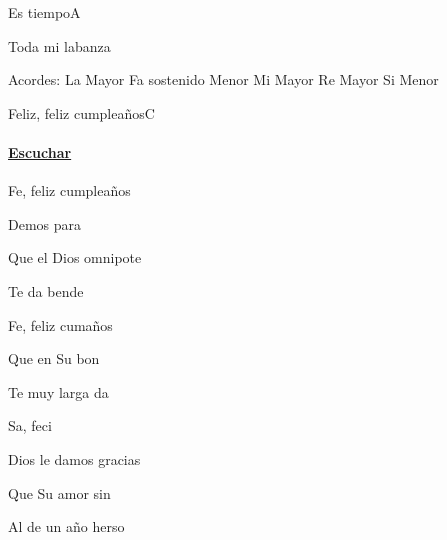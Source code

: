 \documentclass[12pt, spanish]{book}
\newcommand{\NotCCLIed}{\relax}
\begin{document}
\begin{song}{Es tiempo}{A}
\begin{SBOpGroup}
            Toda mi labanza 
        \end{SBOpGroup}

        \ifChordBk
        \begin{SBOpGroup}
            Acordes:
            \upchord{\A}\qquad La Mayor \hfill
            \upchord{\Fsm}\qquad Fa sostenido Menor \hfill\null\break
            \upchord{\E}\qquad Mi Mayor \hfill
            \upchord{\D}\qquad Re Mayor \hfill\null\break
            \upchord{\Bm}\qquad Si Menor \hfill\null\break
        \end{SBOpGroup}
        \fi
    \end{song}

    \begin{song}{Feliz, feliz cumpleaños}{C}
    {} %
    {}
    {} %
    {} %
        \ifChordBk
            \paragraph{\mbox{}\hfill\protect\href{https://open.spotify.com/intl-es/track/5UrYUf67i3ndFFxSTJIgEf}{Escuchar}\mbox{}\hfill}
        \fi

        \begin{SBOpGroup}
            Fe, feliz cumpleaños

            Demos para 

            Que el Dios omnipote

            Te da bende
        \end{SBOpGroup}

        \begin{SBChorus}
            Fe, feliz cumaños

            Que  en Su bon

            Te  muy larga da

            Sa, feci
        \end{SBChorus}

        \begin{SBOpGroup}
             Dios le damos gracias

            Que  Su amor sin 

            Al  de un año herso


\end{SBOpGroup}
\end{song}
\end{document}
